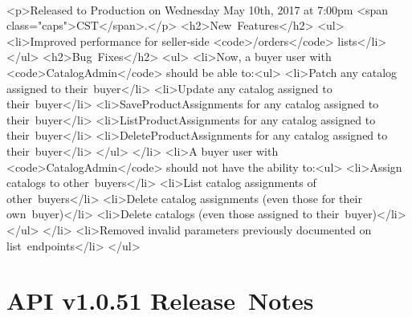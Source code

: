 \documentclass{memoir}%
\begin{document}
\paragraph*{}%
<p>Released to Production on Wednesday May 10th, 2017 at 7:00pm <span class="caps">CST</span>.</p>\newline%
<h2>New~Features</h2>\newline%
<ul>\newline%
<li>Improved performance for seller{-}side <code>/orders</code> lists</li>\newline%
</ul>\newline%
<h2>Bug~Fixes</h2>\newline%
<ul>\newline%
<li>Now, a buyer user with <code>CatalogAdmin</code> should be able to:<ul>\newline%
<li>Patch any catalog assigned to their~buyer</li>\newline%
<li>Update any catalog assigned to their~buyer</li>\newline%
<li>SaveProductAssignments for any catalog assigned to their~buyer</li>\newline%
<li>ListProductAssignments for any catalog assigned to their~buyer</li>\newline%
<li>DeleteProductAssignments for any catalog assigned to their~buyer</li>\newline%
</ul>\newline%
</li>\newline%
<li>A buyer user with <code>CatalogAdmin</code> should not have the ability to:<ul>\newline%
<li>Assign catalogs to other~buyers</li>\newline%
<li>List catalog assignments of other~buyers</li>\newline%
<li>Delete catalog assignments (even those for their own~buyer)</li>\newline%
<li>Delete catalogs (even those assigned to their~buyer)</li>\newline%
</ul>\newline%
</li>\newline%
<li>Removed invalid parameters previously documented on list~endpoints</li>\newline%
</ul>

%
\section*{API v1.0.51 Release~Notes}%
\paragraph*{}%
\end{document}

